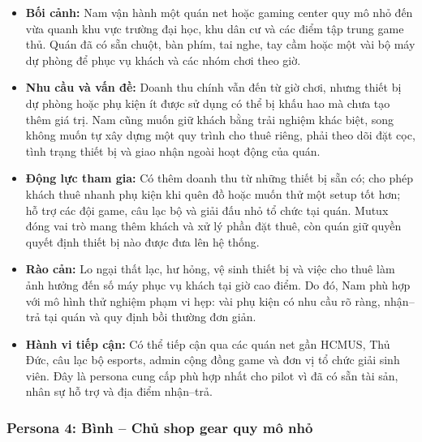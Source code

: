 \begin{itemize}
    \item \textbf{Bối cảnh:} Nam vận hành một quán net hoặc gaming center quy mô nhỏ đến vừa quanh khu vực trường đại học, khu dân cư và các điểm tập trung game thủ. Quán đã có sẵn chuột, bàn phím, tai nghe, tay cầm hoặc một vài bộ máy dự phòng để phục vụ khách và các nhóm chơi theo giờ.
    \item \textbf{Nhu cầu và vấn đề:} Doanh thu chính vẫn đến từ giờ chơi, nhưng thiết bị dự phòng hoặc phụ kiện ít được sử dụng có thể bị khấu hao mà chưa tạo thêm giá trị. Nam cũng muốn giữ khách bằng trải nghiệm khác biệt, song không muốn tự xây dựng một quy trình cho thuê riêng, phải theo dõi đặt cọc, tình trạng thiết bị và giao nhận ngoài hoạt động của quán.
    \item \textbf{Động lực tham gia:} Có thêm doanh thu từ những thiết bị sẵn có; cho phép khách thuê nhanh phụ kiện khi quên đồ hoặc muốn thử một setup tốt hơn; hỗ trợ các đội game, câu lạc bộ và giải đấu nhỏ tổ chức tại quán. Mutux đóng vai trò mang thêm khách và xử lý phần đặt thuê, còn quán giữ quyền quyết định thiết bị nào được đưa lên hệ thống.
    \item \textbf{Rào cản:} Lo ngại thất lạc, hư hỏng, vệ sinh thiết bị và việc cho thuê làm ảnh hưởng đến số máy phục vụ khách tại giờ cao điểm. Do đó, Nam phù hợp với mô hình thử nghiệm phạm vi hẹp: vài phụ kiện có nhu cầu rõ ràng, nhận--trả tại quán và quy định bồi thường đơn giản.
    \item \textbf{Hành vi tiếp cận:} Có thể tiếp cận qua các quán net gần HCMUS, Thủ Đức, câu lạc bộ esports, admin cộng đồng game và đơn vị tổ chức giải sinh viên. Đây là persona cung cấp phù hợp nhất cho pilot vì đã có sẵn tài sản, nhân sự hỗ trợ và địa điểm nhận--trả.
\end{itemize}

\subsubsection{Persona 4: Bình -- Chủ shop gear quy mô nhỏ}

